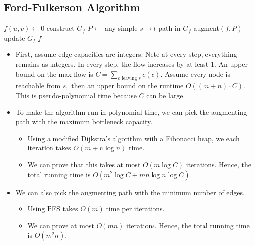 \documentclass[a4paper,12pt]{article}
\begin{document}
\subsection{Ford-Fulkerson Algorithm}
\begin{algorithmic}[1]
            \State $f(u,v)\leftarrow 0$
        \EndForeach
        \State construct $G_f$
            \State $P\gets$ any simple $s\to t$ path in $G_f$
            \State augment$(f,P)$
            \State update $G_f$
        \EndWhile
        \State \Return $f$
    \EndProcedure
\end{algorithmic}
\begin{itemize}
    \item First, assume edge capacities are integers. Note at every step, everything remains as integers. In every step, the flow increases by at least $1.$ An upper bound on the max flow is $C=\sum_{e\text{ leaving }s}c(e).$ Assume every node is reachable from $s,$ then an upper bound on the runtime $O((m+n)\cdot C).$ This is pseudo-polynomial time because $C$ can be large.
    \item To make the algorithm run in polynomial time, we can pick the augmenting path with the maximum bottleneck capacity.\begin{itemize}
        \item Using a modified Dijkstra's algorithm with a Fibonacci heap, we each iteration takes $O(m+n\log n)$ time.
        \item We can prove that this takes at most $O(m\log C)$ iterations. Hence, the total running time is $O(m^2\log C+mn\log n\log C).$
    \end{itemize}
    \item We can also pick the augmenting path with the minimum number of edges. \begin{itemize}
        \item Using BFS takes $O(m)$ time per iterations.
        \item We can prove at most $O(mn)$ iterations. Hence, the total running time is $O(m^2n)$.
    \end{itemize}
\end{itemize}
\end{document}
